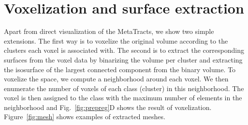 \section {Voxelization and surface extraction}
\label{sec:vis}
Apart from direct visualization of the MetaTracts, we show two simple extensions. The first way is to voxelize the original volume according to the clusters each voxel is associated with.
The second is to extract the corresponding surfaces from the voxel data by binarizing the volume per cluster and extracting the isosurface of the largest connected component from the binary volume. To voxelize the space,  we compute a neighborhood around each voxel. We then enumerate the number of voxels of each class (cluster) in this neighborhood. The voxel is then assigned to the class with the maximum number of elements in the neighborhood and Fig.~\ref{fig:prepreg}D shows the result of voxelization{\tiny }. Figure~\ref{fig:mesh} shows examples of extracted meshes.
%
%
%
